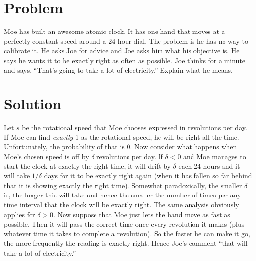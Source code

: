 \documentclass[11pt,a4paper]{report}
\theoremstyle{plain}
\theoremstyle{definition}
\theoremstyle{remark}
\begin{document}
\section*{Problem}
Moe has built an awesome atomic clock.  It has one hand that moves at a perfectly constant speed around a 24 hour dial. The problem is he has no way to calibrate it.  He asks Joe for advice and Joe asks him what his objective is.  He says he wants it to be exactly right as often as possible.  Joe thinks for a minute and says, ``That’s going to take a lot of electricity.'' Explain what he means.

\section*{Solution}
Let $s$ be the rotational speed that Moe chooses expressed in revolutions per day. If Moe can find \emph{exactly} 1 as the rotational speed, he will be right all the time.  Unfortunately, the probability of that is $0$. Now consider what happens when Moe's chosen speed is off by $\delta$ revolutions per day.  If $\delta < 0$ and Moe manages to start the clock at exactly the right time, it will drift by $\delta$ each 24 hours and it will take $1/\delta$ days for it to be exactly right again (when it has fallen so far behind that it is showing exactly the right time). Somewhat paradoxically, the smaller $\delta$ is, the longer this will take and hence the smaller the number of times per any time interval that the clock will be exactly right. The same analysis obviously applies for $\delta > 0$. Now suppose that Moe just lets the hand move as fast as possible. Then it will pass the correct time once every revolution it makes (plus whatever time it takes to complete a revolution). So the faster he can make it go, the more frequently the reading is exactly right. Hence Joe's comment ``that will take a lot of electricity.''
\end{document}
